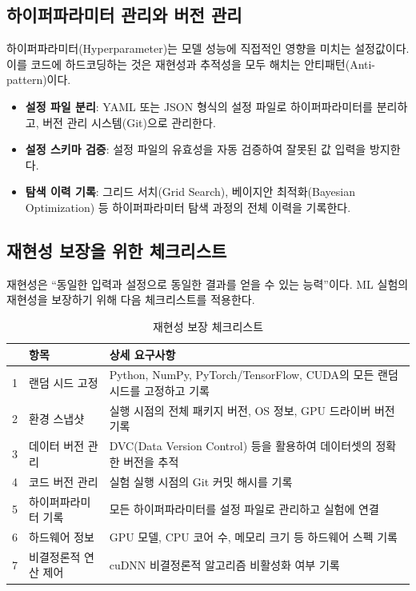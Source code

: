 \subsection{하이퍼파라미터 관리와 버전 관리}
\label{sec:10.2.2}

하이퍼파라미터(Hyperparameter)는 모델 성능에 직접적인 영향을 미치는 설정값이다. 이를 코드에 하드코딩하는 것은 재현성과 추적성을 모두 해치는 안티패턴(Anti-pattern)이다.

\begin{itemize}
  \item \textbf{설정 파일 분리}: YAML 또는 JSON 형식의 설정 파일로 하이퍼파라미터를 분리하고, 버전 관리 시스템(Git)으로 관리한다.
  \item \textbf{설정 스키마 검증}: 설정 파일의 유효성을 자동 검증하여 잘못된 값 입력을 방지한다.
  \item \textbf{탐색 이력 기록}: 그리드 서치(Grid Search), 베이지안 최적화(Bayesian Optimization) 등 하이퍼파라미터 탐색 과정의 전체 이력을 기록한다.
\end{itemize}

\subsection{재현성 보장을 위한 체크리스트}
\label{sec:10.2.3}

재현성은 ``동일한 입력과 설정으로 동일한 결과를 얻을 수 있는 능력''이다. ML 실험의 재현성을 보장하기 위해 다음 체크리스트를 적용한다.

\begin{table}[htbp]
\centering
\caption{재현성 보장 체크리스트}
\label{tab:reproducibility_checklist}
\begin{tabularx}{\textwidth}{p{0.5cm}p{3.5cm}X}
\toprule
 & \textbf{항목} & \textbf{상세 요구사항} \\
\midrule
1 & 랜덤 시드 고정 & Python, NumPy, PyTorch/TensorFlow, CUDA의 모든 랜덤 시드를 고정하고 기록 \\
\midrule
2 & 환경 스냅샷 & 실행 시점의 전체 패키지 버전, OS 정보, GPU 드라이버 버전 기록 \\
\midrule
3 & 데이터 버전 관리 & DVC(Data Version Control) 등을 활용하여 데이터셋의 정확한 버전을 추적 \\
\midrule
4 & 코드 버전 관리 & 실험 실행 시점의 Git 커밋 해시를 기록 \\
\midrule
5 & 하이퍼파라미터 기록 & 모든 하이퍼파라미터를 설정 파일로 관리하고 실험에 연결 \\
\midrule
6 & 하드웨어 정보 & GPU 모델, CPU 코어 수, 메모리 크기 등 하드웨어 스펙 기록 \\
\midrule
7 & 비결정론적 연산 제어 & cuDNN 비결정론적 알고리즘 비활성화 여부 기록 \\
\bottomrule
\end{tabularx}
\end{table}


